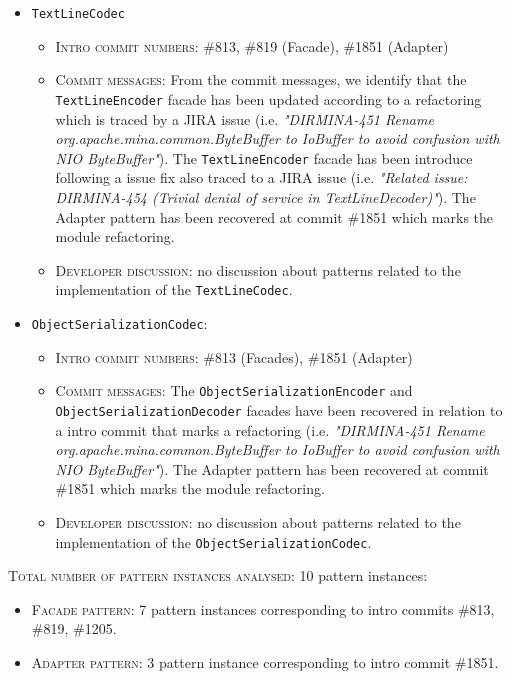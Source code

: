 \begin{itemize}
    \item \texttt{TextLineCodec}
        \begin{itemize}
            \item \textsc{Intro commit numbers}: \#813, \#819 (Facade), \#1851 (Adapter)
            \item \textsc{Commit messages}: From the commit messages, we identify that the \texttt{TextLineEncoder} facade has been updated according to a refactoring which is traced by a JIRA issue (i.e. \textit{"DIRMINA-451 Rename org.apache.mina.common.ByteBuffer to IoBuffer to avoid confusion with NIO ByteBuffer"}). The \texttt{TextLineEncoder} facade has been introduce following a issue fix also traced to a JIRA issue (i.e. \textit{"Related issue: DIRMINA-454 (Trivial denial of service in TextLineDecoder)"}). The Adapter pattern has been recovered at commit \#1851 which marks the module refactoring.
            \item \textsc{Developer discussion}: no discussion about patterns related to the implementation of the \texttt{TextLineCodec}.
        \end{itemize}
    \item \texttt{ObjectSerializationCodec}:
    \begin{itemize}
        \item \textsc{Intro commit numbers}: \#813 (Facades), \#1851 (Adapter)
        \item \textsc{Commit messages}: The \texttt{ObjectSerializationEncoder} and \texttt{ObjectSerializationDecoder} facades have been recovered in relation to a intro commit that marks a refactoring (i.e. \textit{"DIRMINA-451 Rename org.apache.mina.common.ByteBuffer to IoBuffer to avoid confusion with NIO ByteBuffer"}). The Adapter pattern has been recovered at commit \#1851 which marks the module refactoring.
        \item \textsc{Developer discussion}: no discussion about patterns related to the implementation of the \texttt{ObjectSerializationCodec}.
    \end{itemize}
\end{itemize}
\textsc{Total number of pattern instances analysed:} 10 pattern instances:
\begin{itemize}
    \item \textsc{Facade pattern}: 7 pattern instances corresponding to intro commits \#813, \#819, \#1205.
    \item \textsc{Adapter pattern}: 3 pattern instance corresponding to intro commit \#1851.
\end{itemize}

